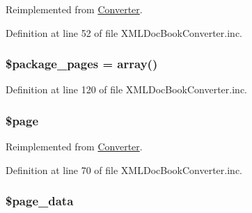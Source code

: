 \-Reimplemented from \hyperlink{class_converter_af0bfe153c049d957e8ea29b147025108}{\-Converter}.



\-Definition at line 52 of file \-X\-M\-L\-Doc\-Book\-Converter.\-inc.

\hypertarget{class_x_m_l_doc_book_converter_acb916db0304b969918dbc0de762d45e0}{
\subsubsection[{\$package\-\_\-pages}]{\setlength{\rightskip}{0pt plus 5cm}\$package\-\_\-pages = array()}}\label{class_x_m_l_doc_book_converter_acb916db0304b969918dbc0de762d45e0}


\-Definition at line 120 of file \-X\-M\-L\-Doc\-Book\-Converter.\-inc.

\hypertarget{class_x_m_l_doc_book_converter_a0a44e6760141442bb439b1ab1395d8ff}{
\subsubsection[{\$page}]{\setlength{\rightskip}{0pt plus 5cm}\$page}}\label{class_x_m_l_doc_book_converter_a0a44e6760141442bb439b1ab1395d8ff}


\-Reimplemented from \hyperlink{class_converter_a0a44e6760141442bb439b1ab1395d8ff}{\-Converter}.



\-Definition at line 70 of file \-X\-M\-L\-Doc\-Book\-Converter.\-inc.

\hypertarget{class_x_m_l_doc_book_converter_a22fa57ada47299e1b00ca90f550a1194}{
\subsubsection[{\$page\-\_\-data}]{\setlength{\rightskip}{0pt plus 5cm}\$page\-\_\-data}}\label{class_x_m_l_doc_book_converter_a22fa57ada47299e1b00ca90f550a1194}


